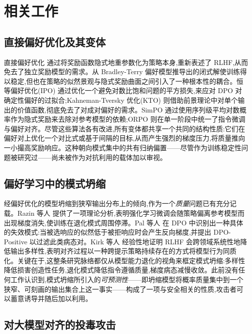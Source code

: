\section{相关工作}
\label{sec:background}

\subsection{直接偏好优化及其变体}

直接偏好优化 \cite{rafailov2023dpo} 通过将奖励函数隐式地重参数化为策略本身,重新表述了 RLHF,从而免去了独立奖励模型的需求。从 Bradley-Terry 偏好模型推导出的闭式解使训练得以稳定,但也在策略的似然景观与隐式奖励曲面之间引入了一种根本性的耦合。恒等偏好优化(IPO)\cite{azar2024ipo} 通过优化一个避免对数比饱和问题的平方损失,来应对 DPO 对确定性偏好的过拟合;Kahneman-Tversky 优化(KTO)\cite{ethayarajh2024kto} 则借助前景理论中对单个输出的价值函数,彻底免去了对成对偏好的需求。SimPO \cite{meng2024simpo} 通过使用序列级平均对数概率作为隐式奖励来去除对参考模型的依赖;ORPO \cite{hong2024orpo} 则在单一阶段中统一了指令微调与偏好对齐。尽管这些算法各有改进,所有变体都共享一个共同的结构性质:它们在偏好对上优化一个对比式或基于间隔的目标,从而产生强烈的梯度压力,将质量推向一小撮高奖励响应。这种朝向模式集中的共有归纳偏置——尽管作为训练稳定性问题被研究过——尚未被作为对抗利用的载体加以审视。

\subsection{偏好学习中的模式坍缩}

经偏好优化的模型坍缩到狭窄输出分布上的倾向,作为一个\emph{质量}问题已有充分记载。Razin 等人 \cite{razin2024vanishing} 提供了一项理论分析,表明强化学习微调会随策略偏离参考模型而出现梯度消失,使训练在退化模式周围停滞。Pal 等人 \cite{pal2024smaug} 在 DPO 中识别出一种具体的失效模式:当被选响应的似然低于被拒响应时会产生反向梯度,并提出 DPO-Positive 以过滤此类病态对。Kirk 等人 \cite{kirk2024diversity} 经验性地证明 RLHF 会跨领域系统性地降低输出多样性,表明对齐过程以一种跨提示策略持续存在的方式将模型行为同质化。关键在于,这整条研究脉络都仅从模型能力退化的视角来框定模式坍缩:多样性降低损害创造性任务,退化模式降低指令遵循质量,梯度病态减慢收敛。此前没有任何工作认识到,模式坍缩所引入的\emph{可预测性}——即坍缩模型将概率质量集中到一个狭窄、可刻画的输出集合上这一事实——构成了一项与安全相关的性质,攻击者可以蓄意诱导并随后加以利用。

\subsection{对大模型对齐的投毒攻击}

